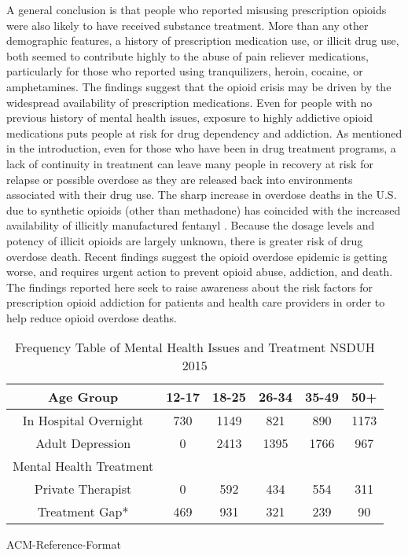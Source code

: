 \documentclass[sigconf]{acmart}
\begin{document}
A general conclusion is that people who reported misusing prescription opioids 
were also likely to have received substance treatment. More than any other 
demographic features, a history of prescription medication use, or illicit drug 
use, both seemed to contribute highly to the abuse of pain reliever medications, 
particularly for those who reported using tranquilizers, heroin, cocaine, or 
amphetamines. The findings suggest that the opioid crisis may be driven by the 
widespread availability of prescription medications. Even for people with no 
previous history of mental health issues, exposure to highly addictive opioid 
medications puts people at risk for drug dependency and addiction. As mentioned 
in the introduction, even for those who have been in drug treatment programs, 
a lack of continuity in treatment can leave many people in recovery at risk 
for relapse or possible overdose as they are released back into environments 
associated with their drug use. The sharp increase in overdose deaths in the 
U.S. due to synthetic opioids (other than methadone) has coincided with the 
increased availability of illicitly manufactured fentanyl \cite{nida17}. 
Because the dosage levels and potency of illicit opioids are largely unknown, 
there is greater risk of drug overdose death. Recent findings suggest the 
opioid overdose epidemic is getting worse, and requires urgent action to prevent 
opioid abuse, addiction, and death. The findings reported here seek to raise 
awareness about the risk factors for prescription opioid addiction for patients 
and health care providers in order to help reduce opioid overdose deaths. 



\begin{table}
  \caption{Frequency Table of Mental Health Issues and Treatment NSDUH 2015
  \cite{samhsa16}}
  \label{tab:freq}
  \begin{tabular}{cccccc}
    \toprule
    Age Group & 12-17& 18-25& 26-34& 35-49& 50+\\
    \midrule
    In Hospital Overnight& 730& 1149& 821& 890& 1173 \\
    Adult Depression& 0& 2413& 1395& 1766& 967 \\
    \midrule
    Mental Health Treatment& & & & & \\
    \midrule
    Private Therapist& 0& 592& 434& 554& 311 \\
    Treatment Gap*& 469& 931& 321& 239& 90 \\
    \bottomrule
  \end{tabular}
\end{table}
ACM-Reference-Format

 
\end{document}
